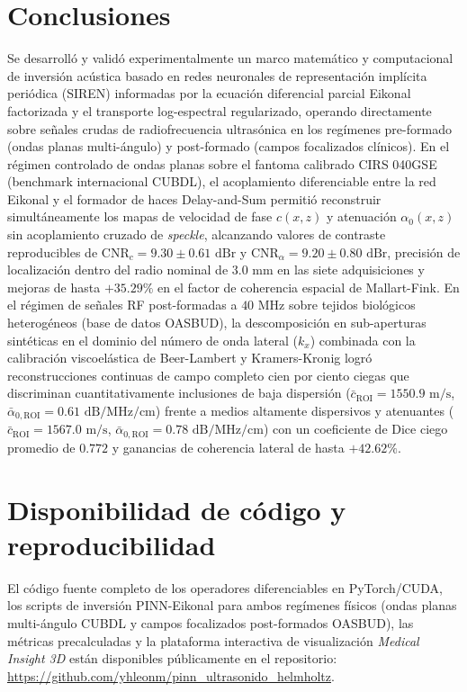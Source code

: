 \documentclass[9pt]{article}
\begin{document}
\section{Conclusiones}
\label{sec:conclusiones}

Se desarrolló y validó experimentalmente un marco matemático y computacional de inversión acústica basado en redes neuronales de representación implícita periódica (SIREN) informadas por la ecuación diferencial parcial Eikonal factorizada y el transporte log-espectral regularizado, operando directamente sobre señales crudas de radiofrecuencia ultrasónica en los regímenes pre-formado (ondas planas multi-ángulo) y post-formado (campos focalizados clínicos). En el régimen controlado de ondas planas sobre el fantoma calibrado CIRS 040GSE (benchmark internacional CUBDL), el acoplamiento diferenciable entre la red Eikonal y el formador de haces Delay-and-Sum permitió reconstruir simultáneamente los mapas de velocidad de fase $c(x,z)$ y atenuación $\alpha_0(x,z)$ sin acoplamiento cruzado de \textit{speckle}, alcanzando valores de contraste reproducibles de $\text{CNR}_c = 9.30 \pm 0.61\text{ dBr}$ y $\text{CNR}_\alpha = 9.20 \pm 0.80\text{ dBr}$, precisión de localización dentro del radio nominal de $3.0\text{ mm}$ en las siete adquisiciones y mejoras de hasta $+35.29\%$ en el factor de coherencia espacial de Mallart-Fink. En el régimen de señales RF post-formadas a $40\text{ MHz}$ sobre tejidos biológicos heterogéneos (base de datos OASBUD), la descomposición en sub-aperturas sintéticas en el dominio del número de onda lateral ($k_x$) combinada con la calibración viscoelástica de Beer-Lambert y Kramers-Kronig logró reconstrucciones continuas de campo completo cien por ciento ciegas que discriminan cuantitativamente inclusiones de baja dispersión ($\bar{c}_{\text{ROI}} = 1550.9\text{ m/s}$, $\bar{\alpha}_{0,\text{ROI}} = 0.61\text{ dB/MHz/cm}$) frente a medios altamente dispersivos y atenuantes ($\bar{c}_{\text{ROI}} = 1567.0\text{ m/s}$, $\bar{\alpha}_{0,\text{ROI}} = 0.78\text{ dB/MHz/cm}$) con un coeficiente de Dice ciego promedio de $0.772$ y ganancias de coherencia lateral de hasta $+42.62\%$.

\section*{Disponibilidad de código y reproducibilidad}
El código fuente completo de los operadores diferenciables en PyTorch/CUDA, los scripts de inversión PINN-Eikonal para ambos regímenes físicos (ondas planas multi-ángulo CUBDL y campos focalizados post-formados OASBUD), las métricas precalculadas y la plataforma interactiva de visualización \textit{Medical Insight 3D} están disponibles públicamente en el repositorio: \url{https://github.com/yhleonm/pinn_ultrasonido_helmholtz}.
\end{document}
